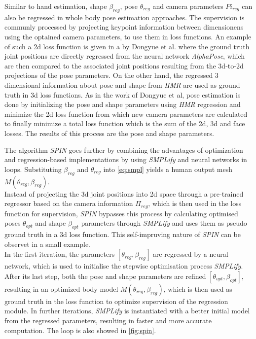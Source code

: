 Similar to hand estimation, shape $\beta_{reg}$, pose $\theta_{reg}$ and camera parameters $Pi_{reg}$ can also be regressed in whole body pose estimation approaches. The supervision is communly processed by projecting keypoint information between dimensionens using the optained camera parameters, to use them in loss functions. An example of such a 2d loss function is given in \cite{chen} a by Dongyue et al. where the ground truth joint positions are directly regressed from the neural network \emph{AlphaPose}, which are then compared to the associated joint positions resulting from the 3d-to-2d projections of the pose parameters. On the other hand, the regressed 3 dimensional information about pose and shape from \emph{HMR} are used as ground truth in 3d loss functions. As in the work of Dongyue et al, pose estimation is done by initializing the pose and shape parameters using \emph{HMR} regression and minimize the 2d loss function from which new camera parameters are calculated to finally minimize a total loss function which is the sum of the 2d, 3d and face losses. The results of this process are the pose and shape parameters.



The algorithm \emph{SPIN} \cite{spin} goes further by combining the advantages of optimization and regression-based implementations by using \emph{SMPLify} and neural networks in loops. Substituting $\beta_{reg}$ and $\theta_{reg}$ into \autoref{eq:smpl} yields a human output mesh $M(\theta_{reg},\beta_{reg})$. \\ 
Instead of projecting the 3d joint positions into 2d space through a pre-trained regressor based on the camera information $\Pi_{reg}$, which is then used in the loss function for supervision, \emph{SPIN} bypasses this process by calculating optimised poses $\theta_{opt}$ and shape $\beta_{opt}$ parameters through \emph{SMPLify} and uses them as pseudo ground truth in a 3d loss function. This self-impruving nature of \emph{SPIN} can be observet in a small example. \\
In the first iteration, the parameters $[\theta_{reg},\beta_{reg}]$ are regressed by a neural network, which is used to initialise the stepwise optimisation process \emph{SMPLify}. After its last step, both the pose and shape parameters are refined $[\theta_{opt},\beta_{opt}]$, resulting in an optimized body model $M(\theta_{reg},\beta_{reg})$, which is then used as ground truth in the loss function to optimize supervision of the regression module. In further iterations, \emph{SMPLify} is instantiated with a better initial model from the regressed parameters, resulting in faster and more accurate computation. The loop is also showed in \autoref{fig:spin}.

